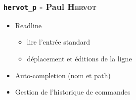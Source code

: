 \subsubsection{\texttt{hervot\_p} - Paul \textsc{Hervot}}

\begin{itemize}
    \item Readline
        \begin{itemize}
            \item lire l'entrée standard
            \item déplacement et éditions de la ligne
        \end{itemize}
    \item Auto-completion (nom et path)
    \item Gestion de l'historique de commandes
\end{itemize}
